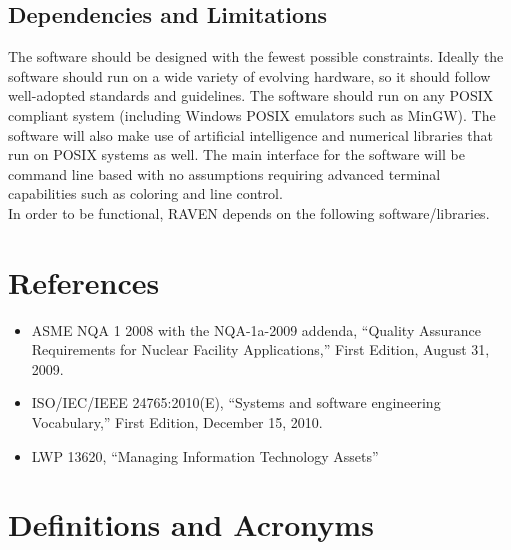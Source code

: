 \subsection{Dependencies and Limitations}
The software should be designed with the fewest possible constraints. 
Ideally the software should run on a wide variety of evolving hardware, 
so it should follow well-adopted standards and guidelines. The software
 should run on any POSIX compliant system (including Windows POSIX 
 emulators such as MinGW). The software will also make use of artificial 
 intelligence and numerical libraries that run on POSIX systems as well. 
 The main interface for the software will be command line based with no 
 assumptions requiring advanced terminal capabilities such as coloring and line control. 
 \\In order to be functional, RAVEN depends on the following software/libraries.


\section{References}

\begin{itemize}

  \item ASME NQA 1 2008 with the NQA-1a-2009 addenda, ``Quality Assurance Requirements for Nuclear Facility Applications,'' First Edition, August 31, 2009.
  \item ISO/IEC/IEEE 24765:2010(E), ``Systems and software engineering Vocabulary,'' First Edition, December 15, 2010.
  \item LWP 13620, ``Managing Information Technology Assets''
\end{itemize}


\section{Definitions and Acronyms}

